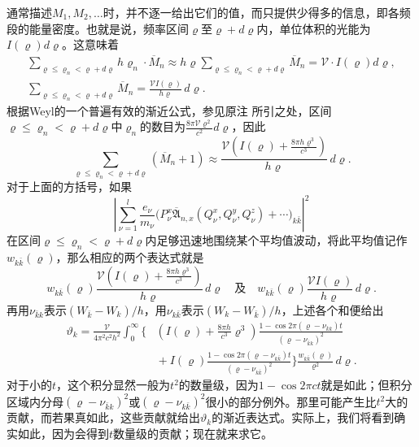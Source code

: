 \documentclass[fontsize=13pt,twoside,openany,headings=normal,parskip=false,bookmarkpackage=false,DIV=calc]{scrbook}
\begin{document}
通常描述$M_1,\allowbreak M_2,\allowbreak \ldots$时，并不逐一给出它们的值，而只提供少得多的信息，即各频段的能量密度。也就是说，频率区间$\varrho$至\hypertarget{origpage-154}{}\label{origpage-154}$\varrho+d\varrho$内，单位体积的光能为$I(\varrho)d\varrho$。这意味着
\begin{gather*}
 \sum_{\varrho\le\varrho_n<\varrho+d\varrho}h\varrho_n\cdot\overline M_n
 \approx h\varrho\sum_{\varrho\le\varrho_n<\varrho+d\varrho}\overline M_n
 =\mathcal V\cdot I(\varrho)d\varrho,\\
 \sum_{\varrho\le\varrho_n<\varrho+d\varrho}\overline M_n
 =\frac{\mathcal V I(\varrho)}{h\varrho}\,d\varrho.
\end{gather*}
根据Weyl的一个普遍有效的渐近公式，参见原注 \hyperlink{note-140}{} 所引之处，区间$\varrho\le\varrho_n<\varrho+d\varrho$中$\varrho_n$的数目为$\frac{8\pi\mathcal V\varrho^2}{c^2}d\varrho$，因此
\[
 \sum_{\varrho\le\varrho_n<\varrho+d\varrho}(\overline M_n+1)
 \approx\frac{\mathcal V\left(I(\varrho)+\frac{8\pi h\varrho^3}{c^3}\right)}{h\varrho}\,d\varrho.
\]
对于上面的方括号，如果
\[
 \left|\sum_{\nu=1}^{l}\frac{e_\nu}{m_\nu}
 \bigl(P_\nu^x\overline{\mathfrak A}_{n,x}(Q_\nu^x,Q_\nu^y,Q_\nu^z)+\cdots\bigr)_{k\bar k}\right|^2
\]
在区间$\varrho\le\varrho_n<\varrho+d\varrho$内足够迅速地围绕某个平均值波动，将此平均值记作$w_{k\bar k}(\varrho)$，那么相应的两个表达式就是
\[
 w_{k\bar k}(\varrho)\frac{\mathcal V\left(I(\varrho)+\frac{8\pi h\varrho^3}{c^3}\right)}{h\varrho}\,d\varrho
 \quad\text{及}\quad
 w_{k\bar k}(\varrho)\frac{\mathcal V I(\varrho)}{h\varrho}\,d\varrho.
\]
再用$\nu_{\bar k k}$表示$(W_{\bar k}-W_k)/h$，用$\nu_{k\bar k}$表示$(W_k-W_{\bar k})/h$，上述各个和便给出
\begin{align*}
 \vartheta_k=\frac{\mathcal V}{4\pi^2c^2h^2}\int_0^{\infty}
 \biggl\{&\left(I(\varrho)+\frac{8\pi h}{c^3}\varrho^3\right)
 \frac{1-\cos2\pi(\varrho-\nu_{\bar k k})t}{(\varrho-\nu_{\bar k k})^2}\\
 &{}+I(\varrho)\frac{1-\cos2\pi(\varrho-\nu_{k\bar k})t}{(\varrho-\nu_{k\bar k})^2}
 \biggr\}\frac{w_{k\bar k}(\varrho)}{\varrho^2}\,d\varrho.
\end{align*}
对于小的$t$，这个积分显然一般为$t^2$的数量级，因为$1-\cos2\pi ct$就是如此；但积分区域内分母$(\varrho-\nu_{\bar k k})^2$或$(\varrho-\nu_{k\bar k})^2$很小的部分例外。那里可能产生比$t^2$大的贡献，而若果真如此，这些贡献就给出$\vartheta_k$的渐近表达式。实际上，我们将看到确实如此，因为会得到$t$数量级的贡献；现在就来求它。
\end{document}
